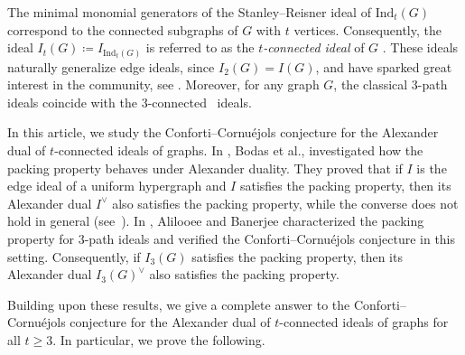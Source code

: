 \documentclass[12pt]{amsart}
\begin{document}
The minimal monomial generators of the Stanley--Reisner ideal of $\mathrm{Ind}_t(G)$ correspond to the connected subgraphs of $G$ with $t$ vertices. Consequently, the ideal $I_t(G) \coloneqq I_{\mathrm{Ind}_t(G)}$ is referred to as the \emph{$t$-connected ideal} of $G$ \cite{2025Ananthnarayan-et.al, 2025Das-et.al}. These ideals naturally generalize edge ideals, since $I_2(G)=I(G)$, and have sparked great interest in the community, see \cite{2023Abdelmalek-et.al, 2025Deshpande-et.al, 2024Deshpande-et.al, 2022Deshpande-et.al,2021Deshpande-et.al, 2025Ghodh-et.al,2025Roy-et.al}. Moreover, for any graph $G$, the classical $3$-path ideals coincide with the $3$-connected~ ideals.

In this article, we study the Conforti--Cornu\'{e}jols conjecture for the Alexander dual of $t$-connected ideals of graphs. In \cite{Bodas-et.al}, Bodas et al., investigated how the packing property behaves under Alexander duality. They proved that if $I$ is the edge ideal of a uniform hypergraph and $I$ satisfies the packing property, then its Alexander dual $I^{\vee}$ also satisfies the packing property, while the converse does not hold in general (see~\cite[Example 5.9]{Bodas-et.al}). In \cite{Alilooee-Banerjee}, Alilooee and Banerjee characterized the packing property for $3$-path ideals and verified the Conforti--Cornu\'{e}jols conjecture in this setting. Consequently, if $I_3(G)$ satisfies the packing property, then its Alexander dual $I_3(G)^{\vee}$ also satisfies the packing property. 

Building upon these results, we give a complete answer to the Conforti--Cornu\'{e}jols conjecture for the Alexander dual of $t$-connected ideals of graphs for all $t\ge 3$. In particular, we prove the following.
\end{document}
